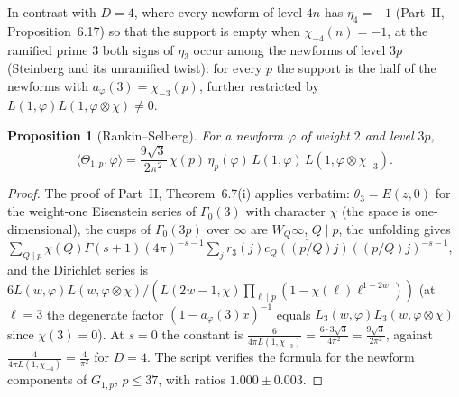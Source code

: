\documentclass[11pt]{amsart}
\newtheorem{proposition}[theorem]{Proposition}
\theoremstyle{remark}
\begin{document}
In contrast with $D=4$, where every newform of level $4n$ has $\eta_4=-1$ (Part~II, Proposition~6.17) so that the support is empty when $\chi_{-4}(n)=-1$, at the ramified prime $3$ both signs of $\eta_3$ occur among the newforms of level $3p$ (Steinberg and its unramified twist): for every $p$ the support is the half of the newforms with $a_\varphi(3)=\chi_{-3}(p)$, further restricted by $L(1,\varphi)L(1,\varphi\otimes\chi)\ne0$.

\begin{proposition}[Rankin--Selberg]\label{prop:RS3}
For a newform $\varphi$ of weight $2$ and level $3p$,
\[
\langle\Theta_{1,p},\varphi\rangle=\frac{9\sqrt3}{2\pi^2}\,\chi(p)\,\eta_p(\varphi)\,L(1,\varphi)\,L(1,\varphi\otimes\chi_{-3}).
\]
\end{proposition}
\begin{proof}
The proof of Part~II, Theorem~6.7(i) applies verbatim: $\theta_3=E(z,0)$ for the weight-one Eisenstein series of $\Gamma_0(3)$ with character $\chi$ (the space is one-dimensional), the cusps of $\Gamma_0(3p)$ over $\infty$ are $W_Q\infty$, $Q\mid p$, the unfolding gives $\sum_{Q\mid p}\chi(Q)\Gamma(s+1)(4\pi)^{-s-1}\sum_jr_3(j)\overline{c_Q((p/Q)j)}((p/Q)j)^{-s-1}$, and the Dirichlet series is $6L(w,\varphi)L(w,\varphi\otimes\chi)/(L(2w-1,\chi)\prod_{\ell\mid p}(1-\chi(\ell)\ell^{1-2w}))$ (at $\ell=3$ the degenerate factor $(1-a_\varphi(3)x)^{-1}$ equals $L_3(w,\varphi)L_3(w,\varphi\otimes\chi)$ since $\chi(3)=0$). At $s=0$ the constant is $\frac{6}{4\pi L(1,\chi_{-3})}=\frac{6\cdot3\sqrt3}{4\pi^2}=\frac{9\sqrt3}{2\pi^2}$, against $\frac4{4\pi L(1,\chi_{-4})}=\frac4{\pi^2}$ for $D=4$. The script verifies the formula for the newform components of $G_{1,p}$, $p\le37$, with ratios $1.000\pm0.003$.
\end{proof}
\end{document}
